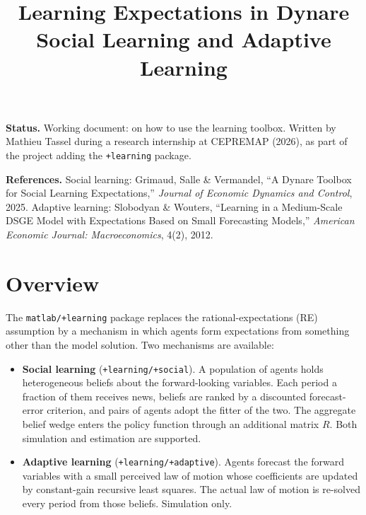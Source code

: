 \documentclass[11pt,a4paper]{article}
\title{\textbf{Learning Expectations in Dynare}\\[0.3em]
       \large Social Learning and Adaptive Learning}
\date{}
\newcommand{\file}[1]{\texttt{#1}}
\begin{document}
\maketitle

\begin{center}
\begin{minipage}{0.85\textwidth}
\small
\textbf{Status.} Working document: on how to use the learning toolbox.
Written by Mathieu Tassel during a research internship at CEPREMAP (2026), as
part of the project adding the \file{+learning} package. 

\medskip
\textbf{References.}
Social learning: Grimaud, Salle \& Vermandel, ``A Dynare Toolbox for Social
Learning Expectations,'' \textit{Journal of Economic Dynamics and Control},
2025.
Adaptive learning: Slobodyan \& Wouters, ``Learning in a Medium-Scale DSGE Model
with Expectations Based on Small Forecasting Models,'' \textit{American Economic
Journal: Macroeconomics}, 4(2), 2012.
\end{minipage}
\end{center}

\tableofcontents
\newpage


\section{Overview}
\label{sec:overview}

The \file{matlab/+learning} package replaces the rational-expectations (RE)
assumption by a mechanism in which agents form expectations from something other
than the model solution. Two mechanisms are available:

\begin{itemize}[leftmargin=2em]
\item \textbf{Social learning} (\file{+learning/+social}). A population of
      agents holds heterogeneous beliefs about the forward-looking variables.
      Each period a fraction of them receives news, beliefs are ranked by a
      discounted forecast-error criterion, and pairs of agents adopt the fitter
      of the two. The aggregate belief wedge enters the policy function through
      an additional matrix $R$. Both simulation and estimation are supported.
\item \textbf{Adaptive learning} (\file{+learning/+adaptive}). Agents forecast
      the forward variables with a small perceived law of motion whose
      coefficients are updated by constant-gain recursive least squares. The
      actual law of motion is re-solved every period from those beliefs.
      Simulation only.
\end{itemize}
\end{document}
